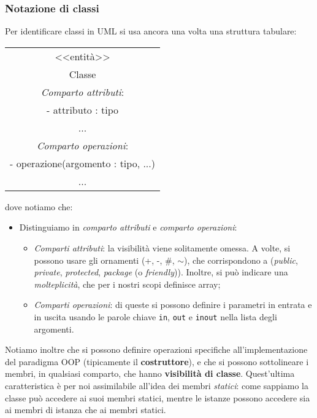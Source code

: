 \documentclass[a4paper,11pt]{article}
\begin{document}
\subsubsection{Notazione di classi}
Per identificare classi in UML si usa ancora una volta una struttura tabulare:
\begin{table}[H]
	\center 
	\begin{tabular} { | c | }
		\hline
		<<entità>> \\ 
		Classe \\
		\hline
		\textit{Comparto attributi}: \\ 
		- attributo : tipo \\
		... \\ 
		\hline
		\textit{Comparto operazioni}: \\ 
		- operazione(argomento : tipo, ...) \\ 
		... \\
		\hline
	\end{tabular}
\end{table}
dove notiamo che:
\begin{itemize}
	\item Distinguiamo in \textit{comparto attributi} e \textit{comparto operazioni}:
		\begin{itemize}
			\item \textit{Comparti attributi}: la visibilità viene solitamente omessa. A volte, si possono usare gli ornamenti (+, -, $\#$, $\sim$), che corrispondono a (\textit{public}, \textit{private}, \textit{protected}, \textit{package} (o \textit{friendly})). Inoltre, si può indicare una \textit{molteplicità}, che per i nostri scopi definisce array;
			\item \textit{Comparti operazioni}: di queste si possono definire i parametri in entrata e in uscita usando le parole chiave \lstinline|in|, \lstinline|out| e \lstinline|inout| nella lista degli argomenti.
		\end{itemize}
\end{itemize}

Notiamo inoltre che si possono definire operazioni specifiche all'implementazione del paradigma OOP (tipicamente il \textbf{costruttore}), e che si possono sottolineare i membri, in qualsiasi comparto, che hanno \textbf{visibilità di classe}.
Quest'ultima caratteristica è per noi assimilabile all'idea dei membri \textit{statici}: come sappiamo la classe può accedere ai suoi membri statici, mentre le istanze possono accedere sia ai membri di istanza che ai membri statici.
\end{document}
